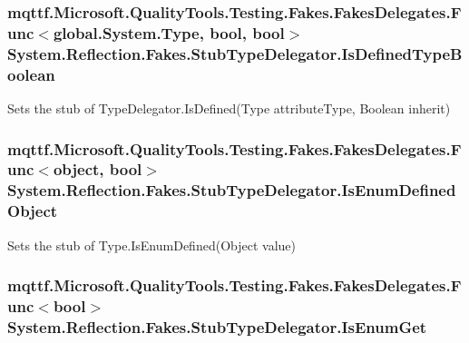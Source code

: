 \hypertarget{class_system_1_1_reflection_1_1_fakes_1_1_stub_type_delegator_a1c6d432981144986fcd80dcab4bab26f}{
\subsubsection[{Is\-Defined\-Type\-Boolean}]{\setlength{\rightskip}{0pt plus 5cm}mqttf.\-Microsoft.\-Quality\-Tools.\-Testing.\-Fakes.\-Fakes\-Delegates.\-Func$<$global.\-System.\-Type, bool, bool$>$ System.\-Reflection.\-Fakes.\-Stub\-Type\-Delegator.\-Is\-Defined\-Type\-Boolean}}\label{class_system_1_1_reflection_1_1_fakes_1_1_stub_type_delegator_a1c6d432981144986fcd80dcab4bab26f}


Sets the stub of Type\-Delegator.\-Is\-Defined(\-Type attribute\-Type, Boolean inherit)

\hypertarget{class_system_1_1_reflection_1_1_fakes_1_1_stub_type_delegator_a88e6cc8de7dff769b730ded96ba68086}{
\subsubsection[{Is\-Enum\-Defined\-Object}]{\setlength{\rightskip}{0pt plus 5cm}mqttf.\-Microsoft.\-Quality\-Tools.\-Testing.\-Fakes.\-Fakes\-Delegates.\-Func$<$object, bool$>$ System.\-Reflection.\-Fakes.\-Stub\-Type\-Delegator.\-Is\-Enum\-Defined\-Object}}\label{class_system_1_1_reflection_1_1_fakes_1_1_stub_type_delegator_a88e6cc8de7dff769b730ded96ba68086}


Sets the stub of Type.\-Is\-Enum\-Defined(\-Object value)

\hypertarget{class_system_1_1_reflection_1_1_fakes_1_1_stub_type_delegator_ad22298c7d41e5cc895c910c118d279c1}{
\subsubsection[{Is\-Enum\-Get}]{\setlength{\rightskip}{0pt plus 5cm}mqttf.\-Microsoft.\-Quality\-Tools.\-Testing.\-Fakes.\-Fakes\-Delegates.\-Func$<$bool$>$ System.\-Reflection.\-Fakes.\-Stub\-Type\-Delegator.\-Is\-Enum\-Get}}\label{class_system_1_1_reflection_1_1_fakes_1_1_stub_type_delegator_ad22298c7d41e5cc895c910c118d279c1}


